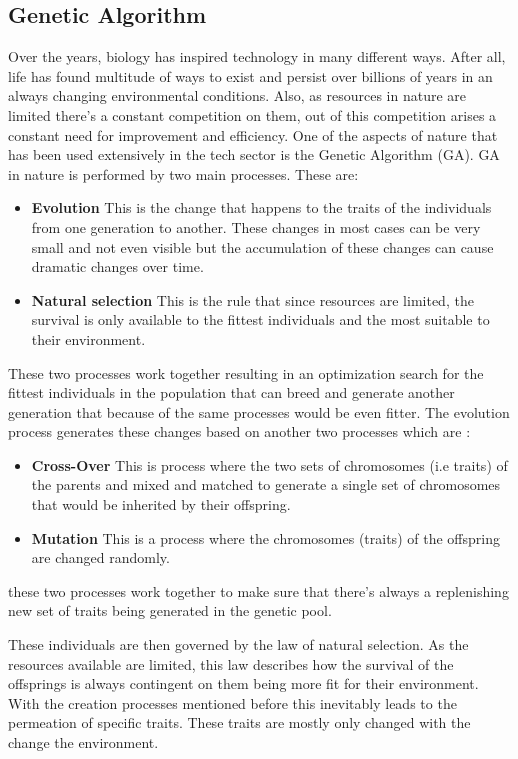 \documentclass[conference]{IEEEtran}
\begin{document}
\subsection{Genetic Algorithm}
Over the years, biology has inspired technology in many different ways. After all, life has found multitude of ways to exist and persist over billions of years in an always changing environmental conditions. Also, as resources in nature are limited there's a constant competition on them, out of this competition arises a constant need for improvement and efficiency. One of the aspects of nature that has been used extensively in the tech sector is the Genetic Algorithm (GA). GA in nature is performed by two main processes. These are: 
\begin{itemize}
    \item \textbf{Evolution} This is the change that happens to the traits of the individuals from one generation to another. These changes in most cases can be very small and not even visible but the accumulation of these changes can cause dramatic changes over time.
    \item \textbf{Natural selection} This is the rule that since resources are limited, the survival is only available to the fittest individuals and the most suitable to their environment.
\end{itemize}
These two processes work together resulting in an optimization search for the fittest individuals in the population that can breed and generate another generation that because of the same processes would be even fitter. The evolution process generates these changes based on another two processes\cite{681007} which are :
\begin{itemize}
    \item \textbf{Cross-Over} This is process where the two sets of chromosomes (i.e traits) of the parents and mixed and matched to generate a single set of chromosomes that would be inherited by their offspring.
    \item \textbf{Mutation} This is a process where the chromosomes (traits) of the offspring are changed randomly.
\end{itemize}
these two processes work together to make sure that there's always a replenishing new set of traits being generated in the genetic pool.

These individuals are then governed by the law of natural selection. As the resources available are limited, this law describes how the survival of the offsprings is always contingent on them being more fit for their environment. With the creation processes mentioned before this inevitably leads to the permeation of specific traits. These traits are mostly only changed with the change the environment.
\end{document}
